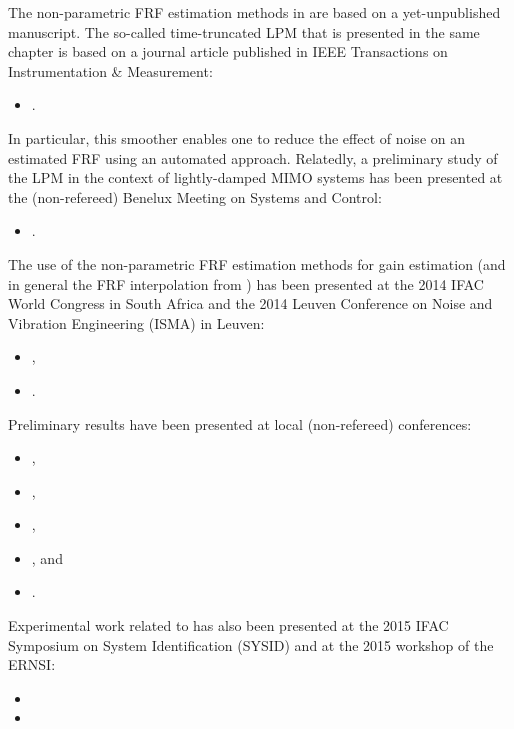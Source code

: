 \begin{refsection}
The non-parametric \gls{FRF} estimation methods in  are based on a yet-unpublished manuscript.
The so-called time-truncated \gls{LPM} that is presented in the same chapter is based on a journal  article published in \gls{IEEE} Transactions on Instrumentation \& Measurement:
\begin{itemize}
  \item {}.
\end{itemize}
In particular, this smoother enables one to reduce the effect of noise on an estimated \gls{FRF} using an automated approach.
Relatedly, a preliminary study of the \gls{LPM} in the context of lightly-damped \gls{MIMO} systems has been presented at the (non-refereed) Benelux Meeting on Systems and Control:
\begin{itemize}
    \item {}.
\end{itemize}

The use of the non-parametric \gls{FRF} estimation methods for \Hinf gain estimation (and in general the \gls{FRF} interpolation from ) has been presented at the 2014 \gls{IFAC} World Congress in South Africa and the 2014 Leuven Conference on Noise and Vibration Engineering (ISMA) in Leuven:
\begin{itemize}
  \item {},
  \item {}.
\end{itemize}
Preliminary results have been presented at local (non-refereed) conferences:
\begin{itemize}
  \item {},
  \item {},
  \item {},
  \item {}, and
  \item {}.
\end{itemize}
Experimental work related to  has also been presented at the 2015 \gls{IFAC} Symposium on System Identification (SYSID) and at the 2015 workshop of the \gls{ERNSI}:
\begin{itemize}
  \item {}
  \item {}
\end{itemize}


\end{refsection}

